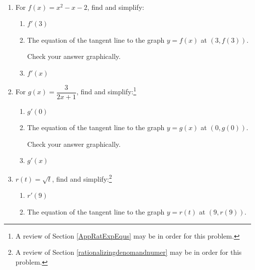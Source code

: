 \documentclass{ximera}
\begin{document}
\begin{example}  \label{morederivativesex} $~$

\begin{enumerate}

\item  For $f(x) = x^2-x-2$, find and simplify:   



\begin{enumerate}

\item  $f'(3)$ %

\item  The equation of the tangent line to the graph $y = f(x)$ at $(3, f(3))$.  

Check your answer graphically.

\item  $f'(x)$ %

\end{enumerate}



\item  For $g(x) = \dfrac{3}{2x+1}$, find and simplify:\footnote{A review of Section \ref{AppRatExpEqus} may be in order for this problem.}



\begin{enumerate}

\item  $g'(0)$ %

\item  The equation of the tangent line to the graph $y = g(x)$ at $(0, g(0))$.  

Check your answer graphically.
 
\item  $g'(x)$ %

\end{enumerate}




\item  $r(t) = \sqrt{t}$,  find and simplify:\footnote{A review of Section \ref{rationalizingdenomandnumer} may be in order for this problem.}

\begin{enumerate}

\item $r'(9)$ %

\item  The equation of the tangent line to the graph $y = r(t)$ at $(9, r(9))$.


\end{enumerate}
\end{enumerate}
\end{example}
\end{document}
